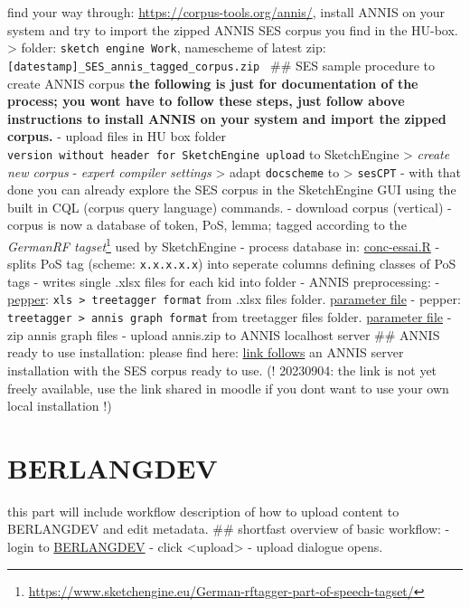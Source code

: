 \documentclass[
  12pt,
]{article}
\begin{document}
find your way through: \url{https://corpus-tools.org/annis/}, install
ANNIS on your system and try to import the zipped ANNIS SES corpus you
find in the HU-box. \textgreater{} folder:
\texttt{sketch\ engine\ Work}, namescheme of latest zip:
\texttt{{[}datestamp{]}\_SES\_annis\_tagged\_corpus.zip~} \#\# SES
sample procedure to create ANNIS corpus \textbf{the following is just
for documentation of the process; you wont have to follow these steps,
just follow above instructions to install ANNIS on your system and
import the zipped corpus.} - upload files in HU box folder
\texttt{version\ without\ header\ for\ SketchEngine\ upload} to
SketchEngine \textgreater{} \emph{create new corpus} - \emph{expert
compiler settings} \textgreater{} adapt \texttt{docscheme} to
\textgreater{} \texttt{sesCPT} - with that done you can already explore
the SES corpus in the SketchEngine GUI using the built in CQL (corpus
query language) commands. - download corpus (vertical) - corpus is now a
database of token, PoS, lemma; tagged according to the \emph{GermanRF
tagset}\footnote{\url{https://www.sketchengine.eu/German-rftagger-part-of-speech-tagset/}}
used by SketchEngine - process database in:
\href{https://github.com/esteeschwarz/HU-LX/blob/main/scripts/conc_essai.R}{conc-essai.R}
- splits PoS tag (scheme: \texttt{x.x.x.x.x}) into seperate columns
defining classes of PoS tags - writes single .xlsx files for each kid
into folder - ANNIS preprocessing: -
\href{https://corpus-tools.org/pepper/}{pepper}:
\texttt{xls\ \textgreater{}\ treetagger\ format} from .xlsx files
folder.
\href{https://github.com/esteeschwarz/HU-LX/blob/main/scripts/r-conxl1.pepper}{parameter
file} - pepper:
\texttt{treetagger\ \textgreater{}\ annis\ graph\ format} from
treetagger files folder.
\href{https://github.com/esteeschwarz/HU-LX/blob/main/scripts/r-conxl2.pepper}{parameter
file} - zip annis graph files - upload annis.zip to ANNIS localhost
server \#\# ANNIS ready to use installation: please find here:
\protect\hyperlink{}{link follows} an ANNIS server installation with the
SES corpus ready to use. (! 20230904: the link is not yet freely
available, use the link shared in moodle if you dont want to use your
own local installation !)

\hypertarget{berlangdev}{%
\section{BERLANGDEV}\label{berlangdev}}

this part will include workflow description of how to upload content to
BERLANGDEV and edit metadata. \#\# shortfast overview of basic workflow:
- login to
\href{https://rs.cms.hu-berlin.de/berlangdev/pages/collection_manage.php}{BERLANGDEV}
- click \textless upload\textgreater{} - upload dialogue opens.
\end{document}
